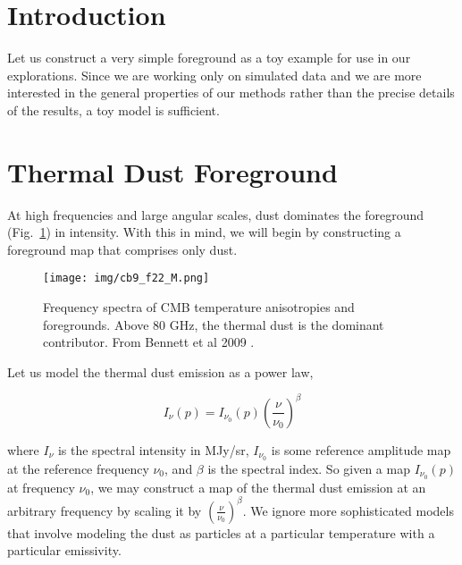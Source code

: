 \documentclass[twoside,10pt]{article}
\title{\doctitle}
\author{\myname}
\date{Feb 10, 2015}
\begin{document}
\maketitle

\section{Introduction}
\label{sec:intro}

Let us construct a very simple foreground as a toy example for use in our
explorations. Since we are working only on simulated data and we are more
interested in the general properties of our methods rather than the precise
details of the results, a toy model is sufficient.

\section{Thermal Dust Foreground} %
\label{sec:thermal_dust_foreground}

At high frequencies and large angular scales, dust dominates the foreground
(Fig.~\ref{fig:foregrounds_vs_frequency}) in intensity. With this in mind, we
will begin by constructing a foreground map that comprises only dust.

\begin{figure}[ht]
    \begin{center}
        \texttt{[image: img/cb9\_f22\_M.png]}
    \end{center}
    \caption{Frequency spectra of CMB temperature anisotropies and
    foregrounds. Above 80 GHz, the thermal dust is the dominant contributor.
    From Bennett et al 2009 \cite{bennett_nine-year_2013}.}
    \label{fig:foregrounds_vs_frequency}
\end{figure}

Let us model the thermal dust emission as a power law,

\begin{equation}
    \label{eq:dust_power_law}
    I_\nu(p) = I_{\nu_0}(p) \left( \frac{\nu}{\nu_0} \right)^\beta
\end{equation}

where $I_\nu$ is the spectral intensity in MJy/sr, $I_{\nu_0}$ is some
reference amplitude map at the reference frequency $\nu_0$, and $\beta$ is the
spectral index. So given a map $I_{\nu_0}(p)$ at frequency $\nu_0$, we may
construct a map of the thermal dust emission at an arbitrary frequency by
scaling it by $\left( \frac{\nu}{\nu_0} \right)^\beta$. We ignore more
sophisticated models that involve modeling the dust as particles at a
particular temperature with a particular emissivity.
\end{document}
